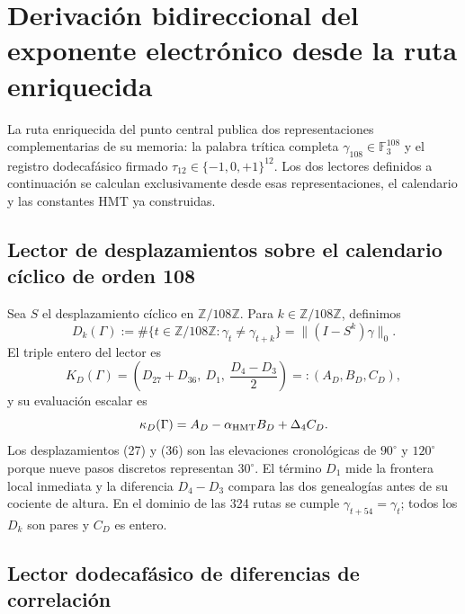 \section{Derivación bidireccional del exponente electrónico desde la ruta enriquecida}
\label{sec:cierre-electron-two-way-rev11}

La ruta enriquecida del punto central publica dos representaciones
complementarias de su memoria: la palabra trítica completa
\(\gamma_{108}\in\mathbb F_3^{108}\) y el registro dodecafásico firmado
\(\tau_{12}\in\{-1,0,+1\}^{12}\). Los dos lectores definidos a continuación
se calculan exclusivamente desde esas representaciones, el calendario y las
constantes HMT ya construidas.

\subsection{Lector de desplazamientos sobre el calendario cíclico de orden 108}

Sea \(S\) el desplazamiento cíclico en \(\mathbb Z/108\mathbb Z\). Para
\(k\in\mathbb Z/108\mathbb Z\), definimos
\begin{equation}
 D_k(\Gamma):=
 \#\{t\in\mathbb Z/108\mathbb Z:\gamma_t\ne\gamma_{t+k}\}
 =\lVert(I-S^k)\gamma\rVert_0.
 \label{eq:lector-dk-ct108-rev11}
\end{equation}
El triple entero del lector es
\begin{equation}
 K_D(\Gamma)=
 \left(D_{27}+D_{36},\ D_1,\ \frac{D_4-D_3}{2}\right)
 =:(A_D,B_D,C_D),
 \label{eq:KD-rev11}
\end{equation}
y su evaluación escalar es
\begin{equation}
 \kappa_D(\Gamma)=A_D-\alpha_{\rm HMT}B_D+\Delta_4 C_D.
 \label{eq:kappaD-rev11}
\end{equation}
Los desplazamientos (27) y (36) son las elevaciones cronológicas de
\(90^\circ\) y \(120^\circ\) porque nueve pasos discretos representan
\(30^\circ\). El término \(D_1\) mide la frontera local inmediata y la
diferencia \(D_4-D_3\) compara las dos genealogías antes de su cociente de
altura. En el dominio de las 324 rutas se cumple
\(\gamma_{t+54}=\gamma_t\); todos los \(D_k\) son pares y \(C_D\) es entero.

\subsection{Lector dodecafásico de diferencias de correlación}

